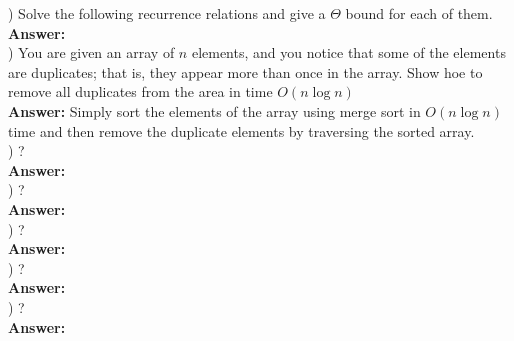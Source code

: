 \documentclass{article}
\begin{document}
\vspace{.3in}
) Solve the following recurrence relations and give a $\Theta$ bound for each of them.\\
\vspace{.1in}
{\bf Answer:} \\

\vspace{.3in}
) You are given an array of $n$ elements, and you notice that some of the elements are duplicates; that is, they appear more than once in the array. Show hoe to remove all duplicates from the area in time $O(n \log n)$\\
\vspace{.1in}
{\bf Answer:} Simply sort the elements of the array using merge sort in $O(n \log n)$ time and then remove the duplicate elements by traversing the sorted array.\\

\vspace{.3in}
) ?\\
\vspace{.1in}
{\bf Answer:} \\

\vspace{.3in}
) ?\\
\vspace{.1in}
{\bf Answer:} \\

\vspace{.3in}
) ?\\
\vspace{.1in}
{\bf Answer:} \\

\vspace{.3in}
) ?\\
\vspace{.1in}
{\bf Answer:} \\

\vspace{.3in}
) ?\\
\vspace{.1in}
{\bf Answer:} \\
\end{document}
